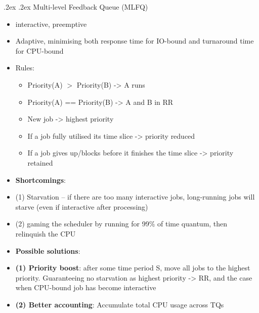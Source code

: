 \documentclass[10pt,landscape,a4paper]{article}
\makeatletter
\renewcommand{\subsubsection}{\@startsection{subsubsection}{1}{0mm}%
  {.2ex}%
  {.2ex}%
{\rmfamily\bfseries}}
\makeatother
\begin{document}
\begin{multicols*}{4}
  \subsubsection{Multi-level Feedback Queue (MLFQ)}
  \begin{itemize}
    \item interactive, preemptive
    \item Adaptive, minimising both response time for IO-bound and turnaround time for CPU-bound
    \item Rules:
    \begin{itemize}
      \item Priority(A) $>$ Priority(B) -> A runs
      \item Priority(A) == Priority(B) -> A and B in RR
      \item New job -> highest priority
      \item If a job fully utilised its time slice -> priority reduced
      \item If a job gives up/blocks before it finishes the time slice -> priority retained
    \end{itemize}
    \item \textbf{Shortcomings}: 
    \item (1) Starvation -- if there are too many interactive jobs, long-running jobs will starve (even if interactive after processing)
    \item (2) gaming the scheduler by running for 99\% of time quantum, then relinquish the CPU
    \item \textbf{Possible solutions}:
    \item \textbf{(1) Priority boost}: after some time period S, move all jobs to the highest priority. Guaranteeing no starvation as highest priority -> RR, and the case when CPU-bound job has become interactive
    \item \textbf{(2) Better accounting}: Accumulate total CPU usage across TQs
  \end{itemize}

\end{multicols*}
\end{document}

